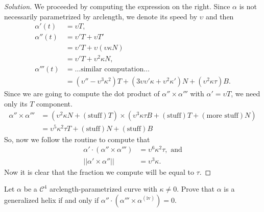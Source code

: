 \documentclass[Shifrin_Solutions_Spring_2018]{subfiles}
\begin{document}
\begin{proof}[Solution]
We proceeded by computing the expression on the right. Since $\alpha$ is not necessarily 
parametrized by arclength, we denote its speed by $\upsilon$ and then
\begin{align*}
\alpha'(t) & = \upsilon T ,\\
\alpha''(t) & = \upsilon' T + \upsilon T' \\
	& = \upsilon' T + \upsilon( \upsilon \kappa N) \\
	& = \upsilon' T + \upsilon^2 \kappa N ,\\
\alpha'''(t) & = \dots \text{similar computation}\dots \\
	& = ( \upsilon''  - \upsilon^3\kappa^2  )T 
	+ ( 3\upsilon \upsilon' \kappa + \upsilon^2\kappa' ) N + (\upsilon^2 \kappa\tau ) B .
\end{align*}
Since we are going to compute the dot product of $\alpha'' \times \alpha'''$ with $\alpha' 
= \upsilon T$, we need only its $T$ component.
\[
\begin{split}
\alpha''\times \alpha''' & = (\upsilon^2 \kappa N + 
  (\text{stuff}) T) \times ( \upsilon^3 \kappa \tau B + 
  (\text{stuff}) T + (\text{more stuff}) N )\\
 & = \upsilon^5 \kappa^2 \tau T + (\text{stuff})N + (\text{stuff})B 
\end{split}
\]
So, now we follow the routine to compute that
\begin{align*}
\alpha' \cdot ( \alpha''\times \alpha''') & = \upsilon^6 \kappa^2 \tau , \text{ and}\\
||\alpha' \times \alpha''|| & = \upsilon^3 \kappa .
\end{align*}
Now it is clear that the fraction we compute will be equal to $\tau$.
\end{proof}

\vspace{.5cm}


\begin{exercise}
Let $\alpha$ be a $\mathcal{C}^4$ arclength-parametrized curve with $\kappa \neq 0$. 
Prove that $\alpha$ is a generalized helix if and only if 
$\alpha''\cdot(\alpha'''\times\alpha^{(\mathrm{iv})}) = 0$.
\end{exercise}
\end{document}
